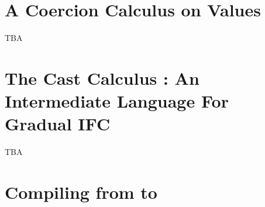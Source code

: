 
\section{A Coercion Calculus on Values}
\label{sec:coercion-calc-values}

TBA

\section{The Cast Calculus \CC: An Intermediate Language For Gradual IFC}
\label{sec:cc}

TBA

\section{Compiling from \Surface to \CC}
\label{sec:compile}
